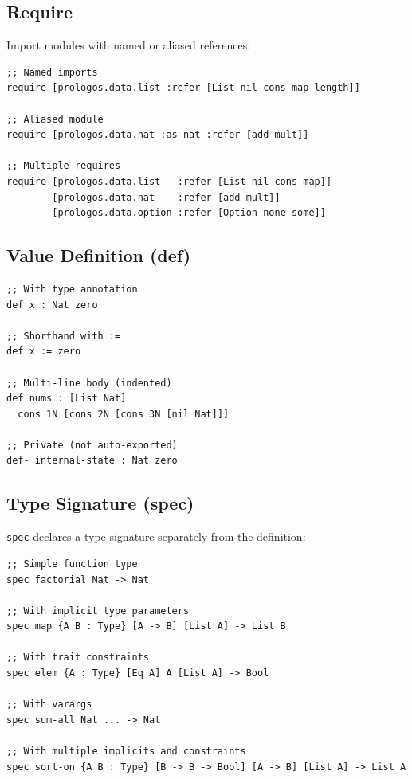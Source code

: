 \documentclass[11pt]{article}
\begin{document}
\subsection{Require}
\label{sec:org8ce16c0}

Import modules with named or aliased references:

\begin{verbatim}
;; Named imports
require [prologos.data.list :refer [List nil cons map length]]

;; Aliased module
require [prologos.data.nat :as nat :refer [add mult]]

;; Multiple requires
require [prologos.data.list   :refer [List nil cons map]]
        [prologos.data.nat    :refer [add mult]]
        [prologos.data.option :refer [Option none some]]
\end{verbatim}
\subsection{Value Definition (def)}
\label{sec:orge7fbea0}

\begin{verbatim}
;; With type annotation
def x : Nat zero

;; Shorthand with :=
def x := zero

;; Multi-line body (indented)
def nums : [List Nat]
  cons 1N [cons 2N [cons 3N [nil Nat]]]

;; Private (not auto-exported)
def- internal-state : Nat zero
\end{verbatim}
\subsection{Type Signature (spec)}
\label{sec:orgd8ae23a}

\texttt{spec} declares a type signature separately from the definition:

\begin{verbatim}
;; Simple function type
spec factorial Nat -> Nat

;; With implicit type parameters
spec map {A B : Type} [A -> B] [List A] -> List B

;; With trait constraints
spec elem {A : Type} [Eq A] A [List A] -> Bool

;; With varargs
spec sum-all Nat ... -> Nat

;; With multiple implicits and constraints
spec sort-on {A B : Type} [B -> B -> Bool] [A -> B] [List A] -> List A
\end{verbatim}
\end{document}
